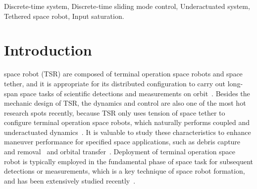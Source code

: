\documentclass[10pt,final,journal]{IEEEtran}
\begin{document}
\begin{IEEEkeywords}
Discrete-time system, Discrete-time sliding mode control, Underactuated system, Tethered space robot, Input saturation.
\end{IEEEkeywords}






\IEEEpeerreviewmaketitle



\section{Introduction}

 space robot (TSR) are composed of terminal operation space robots and space tether, and it is appropriate for its distributed configuration to carry out  long-span space tasks of scientific detections and measurements on orbit~\cite{yu2018review}. 
Besides the mechanic design of TSR, the dynamics and control are also one of the most hot research spots recently, because TSR only uses tension of space tether to configure terminal operation space robots, which naturally performs coupled and underactuated dynamics~\cite{ma2017dynamic}. 
It is valuable to study these characteristics to enhance maneuver performance for specified space applications, such as debris capture and removal~\cite{wang2015coordinated,Zhang2017,Zhang2017JGCD,Huang2017,dai2018post} and orbital transfer~\cite{liu2017tether}.
Deployment of terminal operation space robot is typically employed in the fundamental phase of space task for subsequent detections or measurements, which is a key technique of space robot formation, and has been extensively studied recently~\cite{yu2017analytical,ma2018pure}.
\end{document}
